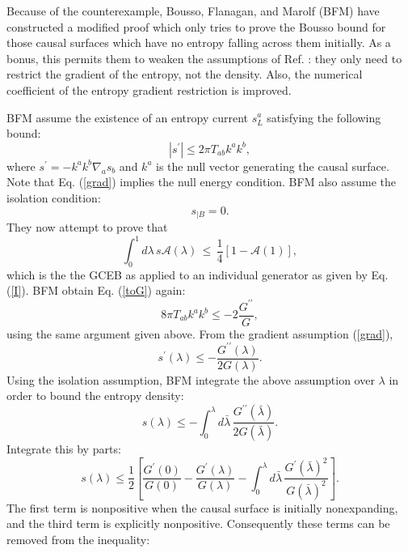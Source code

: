 \documentclass{article}
\begin{document}
Because of the counterexample, Bousso, Flanagan, and Marolf (BFM) \cite{BFM03} have constructed a modified proof which only tries to prove the Bousso bound for those causal surfaces which have no entropy falling across them initially.  As a bonus, this permits them to weaken the assumptions of Ref. \cite{BFM03}: they only need to restrict the gradient of the entropy, not the density.  Also, the numerical coefficient of the entropy gradient restriction is improved.

BFM assume the existence of an entropy current $s^{a}_{L}$ satisfying the following bound:
\begin{equation}\label{grad}
|s^{\prime}| \le 2\pi T_{ab}k^a k^b,
\end{equation}
where $s^{\prime} = -k^a k^b \nabla_{a}s_{b}$ and $k^a$ is the null vector generating the causal surface.  Note that Eq. (\ref{grad}) implies the null energy condition.  BFM also assume the isolation condition:
\begin{equation}\label{isolation}
s_{|B} = 0.
\end{equation}
They now attempt to prove that
\begin{equation}\label{noI}
\int_0^1 d\lambda\,s\mathcal{A}(\lambda)\,\le\,\frac{1}{4}[1 - \mathcal{A}(1)],
\end{equation}
which is the the GCEB as applied to an individual generator as given by Eq. (\ref{I}).  BFM obtain Eq. (\ref{toG}) again:
\begin{equation}
8\pi T_{ab}k^ak^b \le -2\frac{G^{\prime\prime}}{G},
\end{equation}
using the same argument given above.  From the gradient assumption (\ref{grad}),
\begin{equation}
s^{\prime}(\lambda) \le -\frac{G^{\prime\prime}(\lambda)}{2G(\lambda)}.
\end{equation}
Using the isolation assumption, BFM integrate the above assumption over $\lambda$ in order to bound the entropy density:
\begin{equation}
s(\lambda) \le -\int^{\lambda}_0 d\bar{\lambda}\,
\frac{G^{\prime\prime}(\bar{\lambda})}{2G(\bar{\lambda})}.
\end{equation}
Integrate this by parts:
\begin{equation}
s(\lambda) \le \frac{1}{2}\left[
\frac{G^{\prime}(0)}{G(0)} - \frac{G^{\prime}(\lambda)}{G(\lambda)}
- \int^{\lambda}_0 d\bar{\lambda}\,
\frac{G^{\prime}(\bar{\lambda})^2}{G(\bar{\lambda})^2}
\right].
\end{equation}
The first term is nonpositive when the causal surface is initially nonexpanding, and the third term is explicitly nonpositive.  Consequently these terms can be removed from the inequality:
\end{document}
